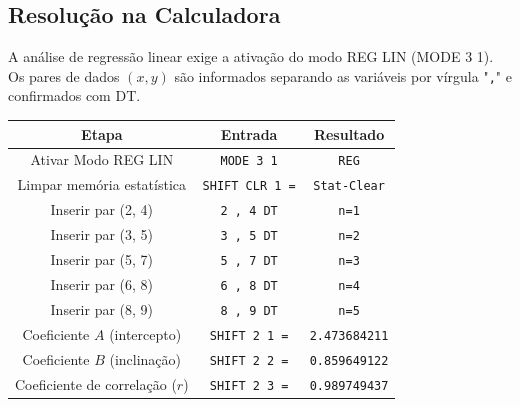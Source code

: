 \subsection*{Resolução na Calculadora}

A análise de regressão linear exige a ativação do modo REG LIN (MODE 3 1). Os pares de dados $(x, y)$ são informados separando as variáveis por vírgula "\texttt{,}" e confirmados com DT.

\begin{table}[H]
    \centering
    \begin{tabular}{|c|c|c|}
        \hline
        \textbf{Etapa} & \textbf{Entrada} & \textbf{Resultado} \\ \hline
        Ativar Modo REG LIN & \texttt{MODE 3 1} & \texttt{REG} \\
        Limpar memória estatística & \texttt{SHIFT CLR 1 =} & \texttt{Stat-Clear} \\
        Inserir par (2, 4) & \texttt{2 , 4 DT} & \texttt{n=1} \\
        Inserir par (3, 5) & \texttt{3 , 5 DT} & \texttt{n=2} \\
        Inserir par (5, 7) & \texttt{5 , 7 DT} & \texttt{n=3} \\
        Inserir par (6, 8) & \texttt{6 , 8 DT} & \texttt{n=4} \\
        Inserir par (8, 9) & \texttt{8 , 9 DT} & \texttt{n=5} \\
        Coeficiente $A$ (intercepto) & \texttt{SHIFT 2 1 =} & \texttt{2.473684211} \\
        Coeficiente $B$ (inclinação) & \texttt{SHIFT 2 2 =} & \texttt{0.859649122} \\
        Coeficiente de correlação ($r$) & \texttt{SHIFT 2 3 =} & \texttt{0.989749437} \\ \hline
    \end{tabular}
\end{table}